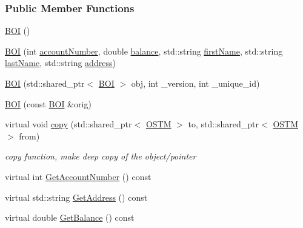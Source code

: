 \subsubsection*{Public Member Functions}
\begin{DoxyCompactItemize}
\item 
\hyperlink{class_b_o_i_a6af682a5f199a029681f0cb2b8658706_a6af682a5f199a029681f0cb2b8658706}{B\+OI} ()
\item 
\hyperlink{class_b_o_i_a1807bd07cad08109c974edbb2c32591c_a1807bd07cad08109c974edbb2c32591c}{B\+OI} (int \hyperlink{class_b_o_i_a35c9fd6e938eb44ad4e076bc6a736851_a35c9fd6e938eb44ad4e076bc6a736851}{account\+Number}, double \hyperlink{class_b_o_i_aa00a3d8baf3420647c40119b7fa4ed6f_aa00a3d8baf3420647c40119b7fa4ed6f}{balance}, std\+::string \hyperlink{class_b_o_i_a12872fd8c15dbf833f78862b00579ed1_a12872fd8c15dbf833f78862b00579ed1}{first\+Name}, std\+::string \hyperlink{class_b_o_i_ad51bfa6f28816c7f5036447ff809cecf_ad51bfa6f28816c7f5036447ff809cecf}{last\+Name}, std\+::string \hyperlink{class_b_o_i_ab9315fe76fd9f07551f5ae7899d33516_ab9315fe76fd9f07551f5ae7899d33516}{address})
\item 
\hyperlink{class_b_o_i_ae4263940f8ffdd40d5f01a714b20f791_ae4263940f8ffdd40d5f01a714b20f791}{B\+OI} (std\+::shared\+\_\+ptr$<$ \hyperlink{class_b_o_i}{B\+OI} $>$ obj, int \+\_\+version, int \+\_\+unique\+\_\+id)
\item 
\hyperlink{class_b_o_i_a7757de8d3ac656871bed4b07d77457ff_a7757de8d3ac656871bed4b07d77457ff}{B\+OI} (const \hyperlink{class_b_o_i}{B\+OI} \&orig)
\item 
virtual void \hyperlink{class_b_o_i_a9ff2d32c25c23a1bea6316f50c3bf677_a9ff2d32c25c23a1bea6316f50c3bf677}{copy} (std\+::shared\+\_\+ptr$<$ \hyperlink{class_o_s_t_m}{O\+S\+TM} $>$ to, std\+::shared\+\_\+ptr$<$ \hyperlink{class_o_s_t_m}{O\+S\+TM} $>$ from)
\begin{DoxyCompactList}\small\item\em copy function, make deep copy of the object/pointer \end{DoxyCompactList}\item 
virtual int \hyperlink{class_b_o_i_a5b18e1538f3d37835234946cdf9f240f_a5b18e1538f3d37835234946cdf9f240f}{Get\+Account\+Number} () const 
\item 
virtual std\+::string \hyperlink{class_b_o_i_a8920e1f47b22445ba954e86012207462_a8920e1f47b22445ba954e86012207462}{Get\+Address} () const 
\item 
virtual double \hyperlink{class_b_o_i_a25b289dece2a1685bb9d1a9332c9be0b_a25b289dece2a1685bb9d1a9332c9be0b}{Get\+Balance} () const 

\end{DoxyCompactItemize}

